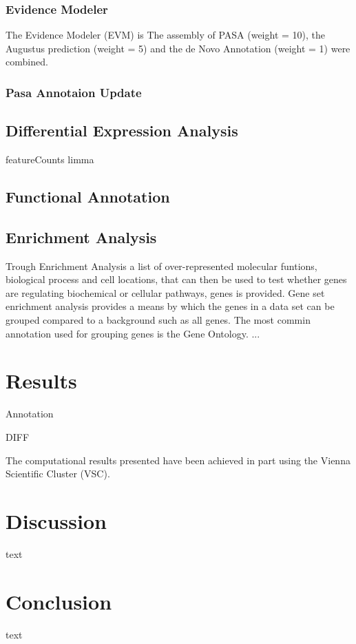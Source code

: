 \documentclass[11pt, a4paper]{report}
\begin{document}
\subsection*{Evidence Modeler}
The Evidence Modeler (EVM) is 
The assembly of PASA (weight = 10), the Augustus prediction (weight = 5) and the de Novo Annotation (weight = 1) were combined. 
\cite{Haas2008}
\subsection*{Pasa Annotaion Update}
\newpage
\section{Differential Expression Analysis}

featureCounts
limma
\section{Functional Annotation}

\section{Enrichment Analysis}
Trough Enrichment Analysis a list of over-represented molecular funtions, biological process and cell locations, that can then be used to test whether genes are regulating biochemical or cellular pathways, genes is provided.
Gene set enrichment analysis provides a means by which the genes in a data set can be grouped compared to a background such as all genes. The most commin annotation used for grouping genes is the Gene Ontology.
...

 
\newpage
\chapter*{Results}
Annotation

DIFF

The computational results presented have been achieved in part using the Vienna Scientific Cluster (VSC).

\newpage
\chapter*{Discussion}
text
\newpage
\chapter*{Conclusion}
text
\newpage
%

\newpage
\listoftables
{}
\newpage
\listoffigures
{}
\end{document}
